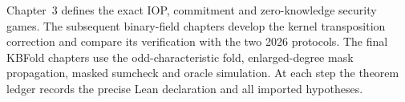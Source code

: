 \begin{remark}
Chapter~3 defines the exact IOP, commitment and zero-knowledge security games. The subsequent binary-field chapters develop the kernel transposition correction and compare its verification with the two 2026 protocols. The final KBFold chapters use the odd-characteristic fold, enlarged-degree mask propagation, masked sumcheck and oracle simulation. At each step the theorem ledger records the precise Lean declaration and all imported hypotheses.
\end{remark}
